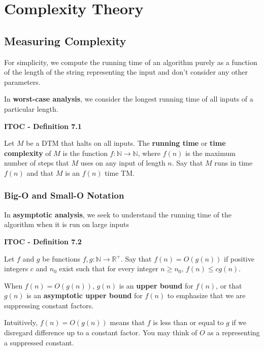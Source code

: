 \section{Complexity Theory}

\subsection{Measuring Complexity}

For simplicity, we compute the running time of an algorithm purely as a function of the length of the string representing the input and don't consider any other parameters.

In \textbf{worst-case analysis}, we consider the longest running time of all inputs of a particular length.

\begin{shaded}
\textbf{ITOC - Definition 7.1}

\medskip
Let $M$ be a DTM that halts on all inputs. The \textbf{running time} or \textbf{time complexity} of $M$ is the function $f: \mathbb{N} \rightarrow \mathbb{N}$, where $f(n)$ is the maximum number of steps that $M$ uses on any input of length $n$. Say that $M$ runs in time $f(n)$ and that $M$ is an $f(n)$ time TM.
\end{shaded}

\subsubsection{Big-O and Small-O Notation}

In \textbf{asymptotic analysis}, we seek to understand the running time of the algorithm when it is run on large inputs

\begin{shaded}
\textbf{ITOC - Definition 7.2}

\medskip
Let $f$ and $g$ be functions $f, g:\mathbb{N} \rightarrow \mathbb{R}^+$. Say that \textbf{$f(n) = O(g(n))$} if positive integers $c$ and $n_0$ exist such that for every integer $n \geq n_0$, $f(n) \leq cg(n)$. 

When $f(n) = O(g(n))$, $g(n)$ is an \textbf{upper bound} for $f(n)$, or that $g(n)$ is an \textbf{asymptotic upper bound} for $f(n)$ to emphasize that we are suppressing constant factors.
\end{shaded}

Intuitively, $f(n) = O(g(n))$ means that $f$ is less than or equal to $g$ if we disregard difference up to a constant factor. You may think of $O$ as a representing a suppressed constant.

